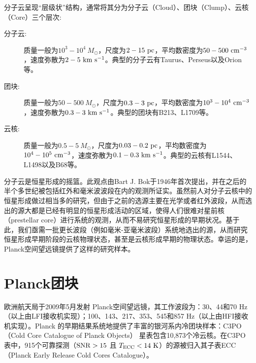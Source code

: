 \documentclass[UTF8]{pkuthss}
\begin{document}
		分子云呈现“层级状”结构\supercite{1994ApJ...423..681V}，通常将其分为分子云（Cloud）、团块（Clump）、云核（Core）三个层次\supercite{2007ARA&A..45..339B,2000prpl.conf...97W}:
		\begin{adjustwidth}{0.5cm}{0.5cm}
		\begin{description}
			\item[分子云:] 质量一般为$10^3-10^4\ M_{\odot}$，尺度为$2-15\rm\ pc$，平均数密度为$50-500\rm\ cm^{-3}$，速度弥散为$2- 5\rm\ km\ s^{-1}$\supercite{2007ARA&A..45..339B}。典型的分子云有Taurus、Perseus以及Orion等。

			\item[团块:] 质量一般为$50-500\ M_{\odot}$，尺度为$0.3-3\rm\ pc$，平均数密度为$10^3-10^4\rm\ cm^{-3}$，速度弥散为$0.3- 3\rm\ km\ s^{-1}$\supercite{2007ARA&A..45..339B}。典型的团块有B213、L1709等\supercite{2007ARA&A..45..339B}。

			\item[云核:] 质量一般为$0.5-5\ M_{\odot}$，尺度为$0.03-0.2\rm\ pc$，平均数密度为$10^4-10^5\rm\ cm^{-3}$，速度弥散为$0.1- 0.3\rm\ km\ s^{-1}$\supercite{2007ARA&A..45..339B}。典型的云核有L1544、L1498以及B68等\supercite{2007ARA&A..45..339B}。
		\end{description}
		\end{adjustwidth}
		
		分子云是恒星形成的摇篮。此观点由Bart J. Bok于1946年首次提出\supercite{1948HarMo...7...53B}，并在之后的半个多世纪被包括红外和毫米波波段在内的观测所证实\supercite{shu1987star,2007ARA&A..45..339B}。虽然前人对分子云核中的恒星形成做过相当多的研究，但由于之前的选源主要在光学或者红外波段，从而选出的源大都是已经有明显的恒星形成活动的区域，使得人们很难对星前核（prestellar core）进行系统的观测，从而不易研究恒星形成的早期状况。基于此，我们亟需一批更长波段（例如毫米-亚毫米波段）系统地选出的源，从而研究恒星形成早期阶段的云核物理状态，甚至是云核形成早期的物理状态。幸运的是，Planck空间望远镜提供了这样的研究样本。

	\section{Planck团块}

		欧洲航天局于2009年5月发射 Planck空间望远镜，其工作波段为：30、44和70 Hz（以上由LFI接收机实现）；100、143、217、353、545和857 Hz（以上由HFI接收机实现）\supercite{2011A&A...536A...1P}。Planck 的早期结果系统地提供了丰富的银河系内冷团块样本：C3PO（Cold Core Catalogue of Planck Objects） 星表包含10,873个冷云核\supercite{2011yCat.8088....0P,2011A&A...536A..23P}。在C3PO表中，915个可靠探测（$\rm SNR>15$ 且 $T_{\rm ECC}<14\rm\ K$）的源被归入其子表ECC（Planck Early Release Cold Cores Catalogue）\supercite{2011yCat.8088....0P,2011A&A...536A..23P}。
\end{document}
